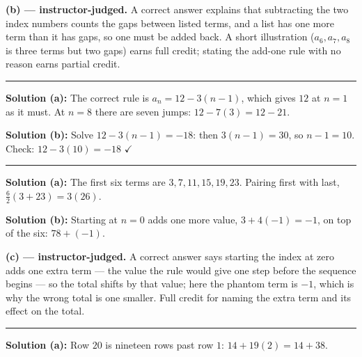 \documentclass[12pt]{article}
\begin{document}
\textbf{(b) --- instructor-judged.} A correct answer explains that subtracting the two index numbers counts the gaps between listed terms, and a list has one more term than it has gaps, so one must be added back. A short illustration ($a_6, a_7, a_8$ is three terms but two gaps) earns full credit; stating the add-one rule with no reason earns partial credit.

\vspace{0.2cm}\noindent\rule{\linewidth}{0.2pt}


\textbf{Solution (a):} The correct rule is $a_n = 12 - 3(n-1)$, which gives $12$ at $n = 1$ as it must. At $n = 8$ there are seven jumps: $12 - 7(3) = 12 - 21$. 

\textbf{Solution (b):} Solve $12 - 3(n-1) = -18$: then $3(n-1) = 30$, so $n - 1 = 10$. Check: $12 - 3(10) = -18$ $\checkmark$ 

\vspace{0.2cm}\noindent\rule{\linewidth}{0.2pt}


\textbf{Solution (a):} The first six terms are $3, 7, 11, 15, 19, 23$. Pairing first with last, $\frac{6}{2}(3 + 23) = 3(26)$. 

\textbf{Solution (b):} Starting at $n = 0$ adds one more value, $3 + 4(-1) = -1$, on top of the six: $78 + (-1)$. 

\textbf{(c) --- instructor-judged.} A correct answer says starting the index at zero adds one extra term --- the value the rule would give one step before the sequence begins --- so the total shifts by that value; here the phantom term is $-1$, which is why the wrong total is one smaller. Full credit for naming the extra term and its effect on the total.

\vspace{0.2cm}\noindent\rule{\linewidth}{0.2pt}


\textbf{Solution (a):} Row $20$ is nineteen rows past row $1$: $14 + 19(2) = 14 + 38$. 
\end{document}
